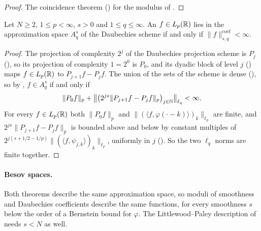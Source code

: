 \begin{proof}
\leanok
{}
The coincidence theorem () for the modulus of
.
\end{proof}

\begin{theorem}
\label{thm:daub-approx-coeff}
\leanok
{}
Let $N \geq 2$, $1 \leq p < \infty$, $s > 0$ and $1 \leq q \leq \infty$. An $f \in L_p(\mathbb{R})$ lies
in the approximation space $A^s_q$ of the Daubechies scheme if and only if
$\|f\|^{\mathrm{coef}}_{s,q} < \infty$.
\end{theorem}

\begin{proof}
\leanok
{}
The projection of complexity $2^j$ of the Daubechies projection scheme is $P_j$
(), so its projection of complexity $1 = 2^0$ is $P_0$, and its dyadic
block of level $j$ () maps $f \in L_p(\mathbb{R})$ to $P_{j+1} f - P_j f$. The union of
the sets of the scheme is dense (), so by , $f \in A^s_q$
if and only if
\[
  \|P_0 f\|_p + \bigl\|\bigl(2^{js} \|P_{j+1} f - P_j f\|_p\bigr)_{j \in \mathbb{N}}\bigr\|_{\ell_q}
  < \infty .
\]
For every $f \in L_p(\mathbb{R})$ both $\|P_0 f\|_p$ and
$\|(\langle f, \varphi(\cdot - k) \rangle)_k\|_{\ell_p}$ are finite, and
$2^{js} \|P_{j+1} f - P_j f\|_p$ is bounded above and below by constant multiples of
$2^{j(s + 1/2 - 1/p)} \|(\langle f, \psi_{j,k} \rangle)_k\|_{\ell_p}$, uniformly in $j$
(). So the two $\ell_q$ norms are finite together.
\end{proof}

\paragraph{Besov spaces.}
Both theorems describe the same approximation space, so moduli of smoothness and Daubechies
coefficients describe the same functions, for every smoothness $s$ below the order of a
Bernstein bound for $\varphi$. The Littlewood--Paley description of  needs
$s < N$ as well.

